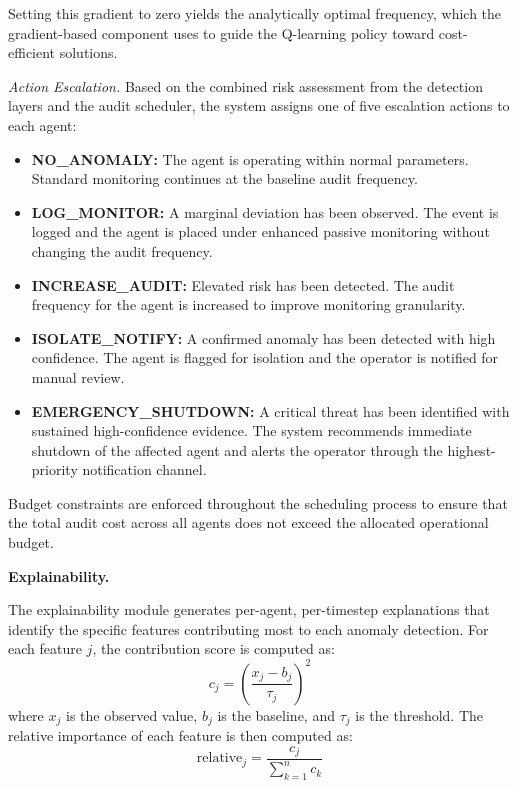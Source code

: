 Setting this gradient to zero yields the analytically optimal frequency, which the gradient-based component uses to guide the Q-learning policy toward cost-efficient solutions.

\par \vspace{0.2cm}
\textit{Action Escalation.} Based on the combined risk assessment from the detection layers and the audit scheduler, the system assigns one of five escalation actions to each agent:

\begin{itemize}
    \item \textbf{NO\_ANOMALY:} The agent is operating within normal parameters. Standard monitoring continues at the baseline audit frequency.
    \item \textbf{LOG\_MONITOR:} A marginal deviation has been observed. The event is logged and the agent is placed under enhanced passive monitoring without changing the audit frequency.
    \item \textbf{INCREASE\_AUDIT:} Elevated risk has been detected. The audit frequency for the agent is increased to improve monitoring granularity.
    \item \textbf{ISOLATE\_NOTIFY:} A confirmed anomaly has been detected with high confidence. The agent is flagged for isolation and the operator is notified for manual review.
    \item \textbf{EMERGENCY\_SHUTDOWN:} A critical threat has been identified with sustained high-confidence evidence. The system recommends immediate shutdown of the affected agent and alerts the operator through the highest-priority notification channel.
\end{itemize}

Budget constraints are enforced throughout the scheduling process to ensure that the total audit cost across all agents does not exceed the allocated operational budget.

\par \vspace{0.35cm}
\textbf{Explainability.}

\par \vspace{0.2cm}
The explainability module generates per-agent, per-timestep explanations that identify the specific features contributing most to each anomaly detection. For each feature $j$, the contribution score is computed as:
\begin{equation}
c_{j} = \left( \frac{x_{j} - b_{j}}{\tau_{j}} \right)^{2}
\label{eq:feature_contribution}
\end{equation}
where $x_{j}$ is the observed value, $b_{j}$ is the baseline, and $\tau_{j}$ is the threshold. The relative importance of each feature is then computed as:
\begin{equation}
\text{relative}_{j} = \frac{c_{j}}{\sum_{k=1}^{n} c_{k}}
\label{eq:relative_importance}
\end{equation}

